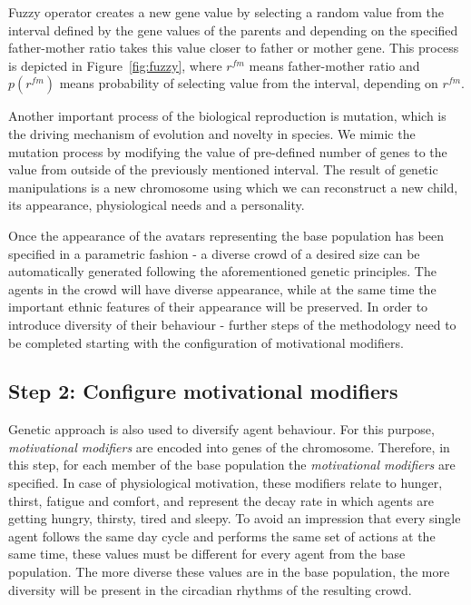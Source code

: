 Fuzzy operator creates a new gene value by selecting a random value from the interval defined by the gene values of the parents and depending on the specified father-mother ratio takes this value closer to father or mother gene. This process is depicted in Figure~\ref{fig:fuzzy}, where $r^{fm}$ means father-mother ratio and $p(r^{fm})$ means probability of selecting value from the interval, depending on $r^{fm}$. 

Another important process of the biological reproduction is mutation, which is the driving mechanism of evolution and novelty in species. We mimic the mutation process by modifying the value of pre-defined number of genes to the value from outside of the previously mentioned interval. The result of genetic manipulations is a new chromosome using which we can reconstruct a new child, its appearance, physiological needs and a personality.

Once the appearance of the avatars representing the base population has been specified in a parametric fashion - a diverse crowd of a desired size can be automatically generated following the aforementioned genetic principles. The agents in the crowd will have diverse appearance, while at the same time the important ethnic features of their appearance will be preserved. In order to introduce diversity of their behaviour - further steps of the methodology need to be completed starting with the configuration of motivational modifiers. 


\subsection{Step 2: Configure motivational modifiers}

\label{sec:step2}

Genetic approach is also used to diversify agent behaviour. For this purpose, \textit{motivational modifiers} are encoded into genes of the chromosome. Therefore, in this step,  for each member of the base population the \textit{motivational modifiers} are specified. In case of physiological motivation, these modifiers relate to hunger, thirst, fatigue and comfort, and represent the decay rate in which agents are getting hungry, thirsty, tired and sleepy. To avoid an impression that every single agent follows the same day cycle and performs the same set of actions at the same time, these values must be different for every agent from the base population. The more diverse these values are in the base population, the more diversity will be present in the circadian rhythms of the resulting crowd.


